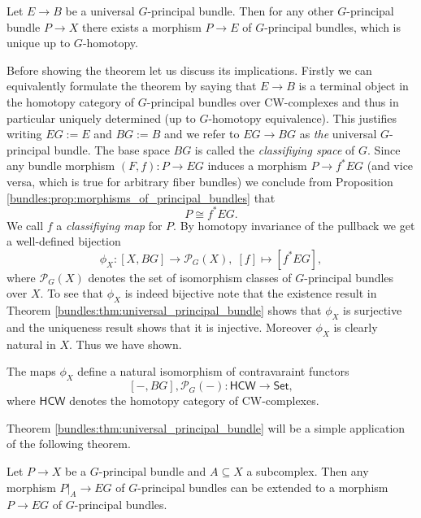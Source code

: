 \begin{theorem}
    \label{bundles:thm:universal_principal_bundle}
    Let $E \to B$ be a universal $G$-principal bundle. Then for any other $G$-principal bundle $P \to X$ there exists a morphism $P \to E$ of $G$-principal bundles, which is unique up to $G$-homotopy.
\end{theorem}

Before showing the theorem let us discuss its implications. Firstly we can equivalently formulate the theorem by saying that $E \to B$ is a terminal object in the homotopy category of $G$-principal bundles over CW-complexes and thus in particular uniquely determined (up to $G$-homotopy equivalence). This justifies writing $EG:= E$ and $BG := B$ and we refer to $EG \to BG$ as \textit{the} universal $G$-principal bundle. The base space $BG$ is called the \textit{classifiying space} of $G$. Since any bundle morphism $(F,f) \colon P \to EG$ induces a morphism $P \to f^\ast EG$ (and vice versa, which is true for arbitrary fiber bundles) we conclude from Proposition \ref{bundles:prop:morphisms_of_principal_bundles} that 
\[
P \cong f^\ast EG.
\]
We call $f$ a \textit{classifiying map} for $P$. By homotopy invariance of the pullback we get a well-defined bijection 
\[
\phi_X \colon [X,BG] \to \mathcal{P}_G(X), \; [f] \mapsto [f^\ast EG],
\]
where $\mathcal{P}_G(X)$ denotes the set of isomorphism classes of $G$-principal bundles over $X$. To see that $\phi_X$ is indeed bijective note that the existence result in Theorem \ref{bundles:thm:universal_principal_bundle} shows that $\phi_X$ is surjective and the uniqueness result shows that it is injective. Moreover $\phi_X$ is clearly natural in $X$. Thus we have shown.

\begin{corollary}
\label{bundles:cor:universal_bundle_defines_natural_isomorphism}
    The maps $\phi_X$ define a natural isomorphism of contravaraint functors 
    \[  
        [-,BG], \mathcal{P}_G(-) \colon \mathsf{HCW} \to \mathsf{Set},
    \]
    where $\mathsf{HCW}$ denotes the homotopy category of CW-complexes.
\end{corollary}

Theorem \ref{bundles:thm:universal_principal_bundle} will be a simple application of the following theorem.

\begin{theorem}
    \label{bundles:thm:extension_theorem}
    Let $P \to X$ be a $G$-principal bundle and $A \subseteq X$ a subcomplex. Then any morphism $P|_A \to EG$ of $G$-principal bundles can be extended to a morphism $P \to EG$ of $G$-principal bundles. 
\end{theorem}

